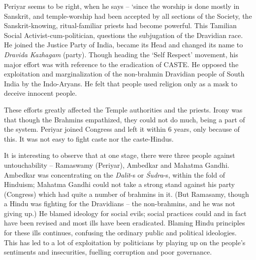 Periyar seems to be right, when he says – ‘since the worship is done mostly in Sanskrit, and temple-worship had been accepted by all sections of the Society, the Sanskrit-knowing, ritual-familiar priests had become powerful. This Tamilian Social Activist-cum-politician, questions the subjugation of the Dravidian race. He joined the Justice Party of India, became its Head and changed its name to \textit{Dravida Kazhagam} (party). Though heading the ‘Self Respect’ movement, his major effort was with reference to the eradication of CASTE. He opposed the exploitation and marginalization of the non-brahmin Dravidian people of South India by the Indo-Aryans. He felt that people used religion only as a mask to deceive innocent people.

These efforts greatly affected the Temple authorities and the priests. Irony was that though the Brahmins empathized, they could not do much, being a part of the system. Periyar joined Congress and left it within 6 years, only because of this. It was not easy to fight caste nor the caste-Hindus.

It is interesting to observe that at one stage, there were three people against untouchability – Ramaswamy (Periyar), Ambedkar and Mahatma Gandhi. Ambedkar was concentrating on the \textit{Dalit}-s or \textit{Śudra}-s, within the fold of Hinduism; Mahatma Gandhi could not take a strong stand against his party (Congress) which had quite a number of brahmins in it. (But Ramasamy, though a Hindu was fighting for the Dravidians – the non-brahmins, and he was not giving up.) He blamed ideology for social evils; social practices could and in fact have been revised and most ills have been eradicated. Blaming Hindu principles for these ills continues, confusing the ordinary public and political ideologies. This has led to a lot of exploitation by politicians by playing up on the people’s sentiments and insecurities, fuelling corruption and poor governance.

